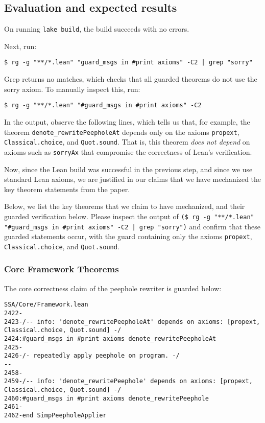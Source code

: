 \documentclass{sigplanconf}
\begin{document}
\subsection{Evaluation and expected results}

On running \texttt{lake build}, the build succeeds with no errors.

Next, run:

\begin{verbatim}
$ rg -g "**/*.lean" "guard_msgs in #print axioms" -C2 | grep "sorry"
\end{verbatim}

Grep returns no matches, which checks that all guarded theorems do not use the sorry axiom.
To manually inspect this, run:

\begin{verbatim}
$ rg -g "**/*.lean" "#guard_msgs in #print axioms" -C2
\end{verbatim}

In the output, observe the following lines, which tells us that, for example, the 
theorem \texttt{denote\_rewritePeepholeAt} depends only on the axioms 
\texttt{propext}, \texttt{Classical.choice}, and \texttt{Quot.sound}. That is, this theorem 
\emph{does not depend} on axioms such as \texttt{sorryAx} that compromise the correctness of Lean's verification.

Now, since the Lean build was successful in the previous step, and since we use standard Lean axioms, 
we are justified in our claims that we have mechanized the key theorem statements from the paper.

Below, we list the key theorems that we claim to have mechanized, and their 
guarded verification below. Please inspect the output of 
\texttt{(\$ rg -g "**/*.lean" "\#guard\_msgs in \#print axioms" -C2 | grep "sorry")}
and confirm that these guarded statements occur, with the guard containing only the axioms \texttt{propext},
\texttt{Classical.choice}, and \texttt{Quot.sound}.

\subsubsection{Core Framework Theorems}

The core correctness claim of the peephole rewriter is guarded below:

\begin{verbatim}
SSA/Core/Framework.lean
2422-
2423-/-- info: 'denote_rewritePeepholeAt' depends on axioms: [propext, Classical.choice, Quot.sound] -/
2424:#guard_msgs in #print axioms denote_rewritePeepholeAt
2425-
2426-/- repeatedly apply peephole on program. -/
--
2458-
2459-/-- info: 'denote_rewritePeephole' depends on axioms: [propext, Classical.choice, Quot.sound] -/
2460:#guard_msgs in #print axioms denote_rewritePeephole
2461-
2462-end SimpPeepholeApplier
\end{verbatim}
\end{document}
